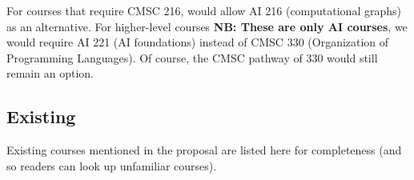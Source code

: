 \documentclass[
10pt, %
a4paper, %
oneside, %
headinclude,footinclude, %
BCOR5mm, %
]{scrartcl}
\begin{document}
    For courses that require CMSC 216, would allow AI 216 (computational graphs) as an alternative.  For higher-level courses \textbf{NB: These are only AI courses}, we would require AI 221 (AI foundations) instead of CMSC 330 (Organization of Programming Languages).  Of course, the CMSC pathway of 330 would still remain an option.

    

  \subsection{Existing}

    Existing courses mentioned in the proposal are listed here for completeness (and so readers can look up unfamiliar courses).  

  
  
  








% 


\end{document}
